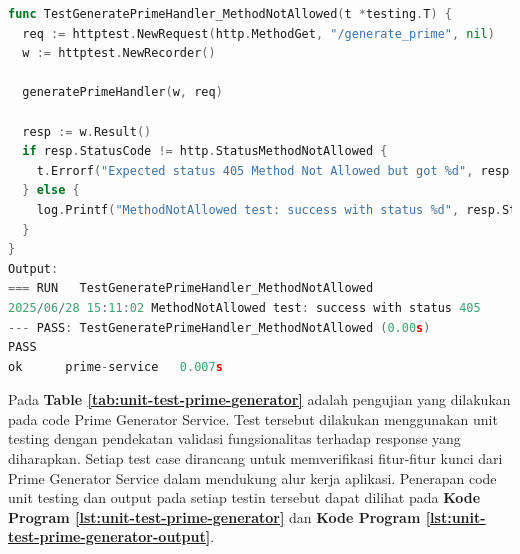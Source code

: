 \begin{lstlisting}[language=go, 
  basicstyle=\footnotesize\ttfamily,
  caption={Kode Unit Testing Pada Prime Generator Service 2},
  label={lst:unit-test-prime-generator-output}
]
func TestGeneratePrimeHandler_MethodNotAllowed(t *testing.T) {
  req := httptest.NewRequest(http.MethodGet, "/generate_prime", nil)
  w := httptest.NewRecorder()

  generatePrimeHandler(w, req)

  resp := w.Result()
  if resp.StatusCode != http.StatusMethodNotAllowed {
    t.Errorf("Expected status 405 Method Not Allowed but got %d", resp.StatusCode)
  } else {
    log.Printf("MethodNotAllowed test: success with status %d", resp.StatusCode)
  }
}
Output:
=== RUN   TestGeneratePrimeHandler_MethodNotAllowed
2025/06/28 15:11:02 MethodNotAllowed test: success with status 405
--- PASS: TestGeneratePrimeHandler_MethodNotAllowed (0.00s)
PASS
ok      prime-service   0.007s
\end{lstlisting}

Pada \textbf{Table \ref{tab:unit-test-prime-generator}} adalah pengujian yang
dilakukan pada code Prime Generator Service. Test tersebut dilakukan
menggunakan unit testing dengan pendekatan validasi fungsionalitas terhadap
response yang diharapkan. Setiap test case dirancang untuk memverifikasi
fitur-fitur kunci dari Prime Generator Service dalam mendukung alur kerja
aplikasi. Penerapan code unit testing dan output pada setiap testin tersebut
dapat dilihat pada \textbf{Kode Program \ref{lst:unit-test-prime-generator}}
dan \textbf{Kode Program \ref{lst:unit-test-prime-generator-output}}.


